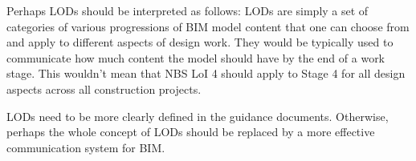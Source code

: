 Perhaps 
LODs should be interpreted as follows:
LODs are simply a set of categories of various progressions of BIM model content that one can choose from and apply to different aspects of design work.
They would be typically used to communicate how much content the model should have by the end of a work stage.
This wouldn't mean that NBS LoI 4 should apply to Stage 4 for all design aspects across all construction projects.

LODs need to be more clearly defined in the guidance documents.
Otherwise, perhaps the whole concept of LODs should be replaced by a more effective communication system for BIM.
